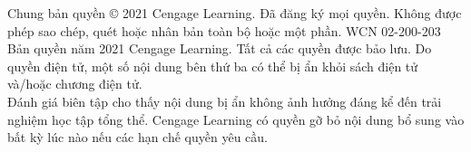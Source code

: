 \vfill
\noindent
\begin{minipage}{\textwidth}
  \centering
  \fontsize{6.3pt}{7.5pt}\selectfont\color{gray}
  Chung bản quyền © 2021 Cengage Learning. Đã đăng ký mọi quyền. Không được phép sao chép, quét hoặc nhân bản toàn bộ hoặc một phần. WCN 02-200-203\\ 
  Bản quyền năm 2021 Cengage Learning. Tất cả các quyền được bảo lưu. Do quyền điện tử, một số nội dung bên thứ ba có thể bị ẩn khỏi sách điện tử và/hoặc chương điện tử.\\ 
  Đánh giá biên tập cho thấy nội dung bị ẩn không ảnh hưởng đáng kể đến trải nghiệm học tập tổng thể. Cengage Learning có quyền gỡ bỏ nội dung bổ sung vào bất kỳ lúc nào nếu các hạn chế quyền yêu cầu.
\end{minipage}
